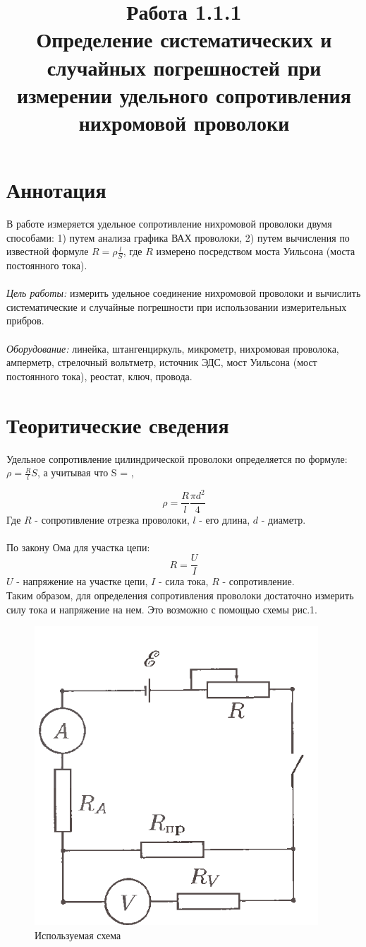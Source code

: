 \documentclass{article}
\title{Работа 1.1.1\\ 
	Определение систематических и случайных погрешностей при измерении удельного сопротивления нихромовой проволоки}
\begin{document}
	
	\maketitle
	
	\section{Аннотация}
	В работе измеряется удельное сопротивление нихромовой проволоки двумя способами: 1) путем анализа графика ВАХ проволоки, 2) путем вычисления по известной формуле \(R = \rho \frac{l}{S}\), где \( R\) измерено  посредством моста Уильсона (моста постоянного тока).\\\\
	\emph{Цель работы:} измерить удельное соединение нихромовой проволоки и вычислить систематические и случайные погрешности при использовании измерительных прибров. \\\\
	\emph{Оборудование:} линейка, штангенциркуль, микрометр, нихромовая проволока, амперметр, стрелочный вольтметр, источник ЭДС, мост Уильсона (мост постоянного тока), реостат, ключ, провода.
	
	\section{Теоритические сведения}
	
	Удельное сопротивление цилиндрической проволоки определяется по формуле:
	\(\rho = \frac{R}{l}S\), а учитывая что S = {\pi}{},
	
	$$\rho = \frac{R}{l}{\frac{{\pi}d^2}{4}}$$
	Где $R$ - сопротивление отрезка проволоки, $l$ - его длина, $d$ - диаметр.\\\\
	По закону Ома для участка цепи: 
	$$R = \frac{U}{I}$$
	$U$ - напряжение на участке цепи, $I$ - сила тока, $R$ - сопротивление.\\
	
	Таким образом, для определения сопротивления проволоки достаточно измерить силу тока и напряжение на нем. Это возможно с помощью схемы рис.1.\\
	\begin{figure}
		\centering
		\includegraphics[width = 0.5\linewidth]{1.png}
		\caption{Используемая схема}
		\label{fig:enter-label}
	\end{figure}
	
\end{document}
